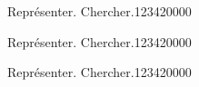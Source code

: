 \begin{pageParcoursu}

\begin{ExoCu}{Représenter. Chercher.}{1234}{2}{0}{0}{0}{0}
 
\end{ExoCu}

\begin{ExoCu}{Représenter. Chercher.}{1234}{2}{0}{0}{0}{0}
 
\end{ExoCu}

\begin{ExoCu}{Représenter. Chercher.}{1234}{2}{0}{0}{0}{0}
 
\end{ExoCu}


\end{pageParcoursu}

